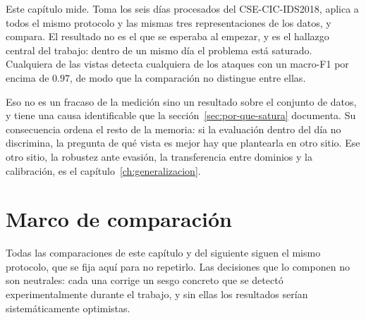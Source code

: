 %
%
%
%

Este capítulo mide. Toma los seis días procesados del CSE-CIC-IDS2018, aplica a
todos el mismo protocolo y las mismas tres representaciones de los datos, y
compara. El resultado no es el que se esperaba al empezar, y es el hallazgo
central del trabajo: dentro de un mismo día el problema está saturado.
Cualquiera de las vistas detecta cualquiera de los ataques con un macro-F1 por
encima de $0.97$, de modo que la comparación no distingue entre ellas.

Eso no es un fracaso de la medición sino un resultado sobre el conjunto de
datos, y tiene una causa identificable que la sección~\ref{sec:por-que-satura}
documenta. Su consecuencia ordena el resto de la memoria: si la evaluación
dentro del día no discrimina, la pregunta de qué vista es mejor hay que
plantearla en otro sitio. Ese otro sitio, la robustez ante evasión, la
transferencia entre dominios y la calibración, es el
capítulo~\ref{ch:generalizacion}.

\section{Marco de comparación}
\label{sec:marco}

Todas las comparaciones de este capítulo y del siguiente siguen el mismo
protocolo, que se fija aquí para no repetirlo. Las decisiones que lo componen no
son neutrales: cada una corrige un sesgo concreto que se detectó
experimentalmente durante el trabajo, y sin ellas los resultados serían
sistemáticamente optimistas.

